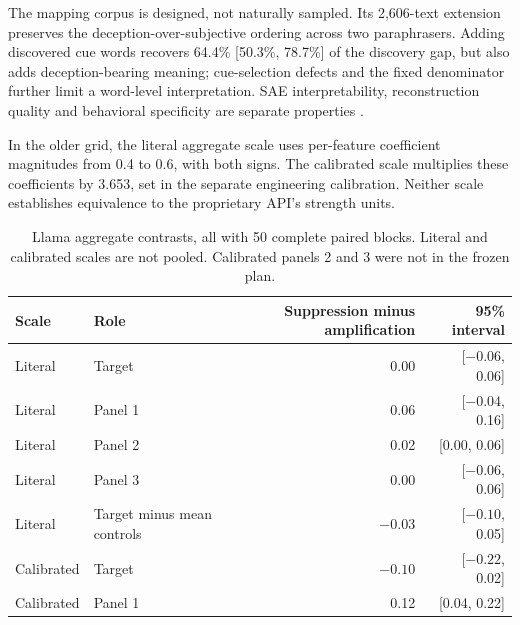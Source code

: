 \documentclass[11pt]{article}
\newcommand{\artifact}[2]{\href{https://github.com/tdj28/llm_selfref_pre/blob/f5e906e1737bc71bf20b642af1d698018eec82fe/#1}{#2}}
\begin{document}
\begin{table}[tb]
\centering\small
\caption{\textbf{What the six steered features respond to.} Mean maximum
activation of each feature over the \FeatureMapPerCategory{} designed texts in
each category, read through the public layer-50 SAE on Llama 3.3 70B with
4-bit weights. Each feature's strongest category is in bold. The texts were
written for this test rather than sampled from natural use, and the table
shows what turns each feature on, not what steering it does. Source: the
mapping release's
\artifact{data/public_sae_feature_maps/70b_balanced_80_20260709/interpretation/target_category_matrix.csv}{category
matrix}, recomputed from its
\artifact{data/public_sae_feature_maps/70b_balanced_80_20260709/item_feature_activations.jsonl}{item-level
records} ().}
\label{tab:feature-map}

\end{table}

The mapping corpus is designed, not naturally sampled.
Its 2,606-text extension preserves the deception-over-subjective ordering
across two paraphrasers. Adding discovered cue words recovers
64.4\% [50.3\%, 78.7\%] of the discovery gap, but also adds deception-bearing
meaning; cue-selection defects and the fixed denominator further limit a
word-level interpretation. SAE interpretability, reconstruction quality
and behavioral specificity are separate properties
\citep{cunningham2023sparse,gao2024scaling,durmus2024steering}.

In the older grid, the literal aggregate scale uses per-feature coefficient
magnitudes from 0.4 to 0.6, with both signs. The calibrated scale multiplies
these coefficients by 3.653, set in the separate engineering calibration.
Neither scale establishes equivalence to the proprietary API's strength units.

\begin{table}[htbp]
\centering\small
\caption{Llama aggregate contrasts, all with 50 complete paired blocks.
Literal and calibrated scales are not pooled. Calibrated panels 2 and 3 were
not in the frozen plan.}
\label{tab:scales}
\begin{tabular}{@{}llrr@{}}
\toprule
Scale & Role & Suppression minus amplification & 95\% interval\\
\midrule
Literal & Target & 0.00 & [$-0.06$, 0.06]\\
Literal & Panel 1 & 0.06 & [$-0.04$, 0.16]\\
Literal & Panel 2 & 0.02 & [0.00, 0.06]\\
Literal & Panel 3 & 0.00 & [$-0.06$, 0.06]\\
Literal & Target minus mean controls & $-0.03$ & [$-0.10$, 0.05]\\
\midrule
Calibrated & Target & $-0.10$ & [$-0.22$, 0.02]\\
Calibrated & Panel 1 & 0.12 & [0.04, 0.22]\\
\bottomrule
\end{tabular}
\end{table}
\end{document}
